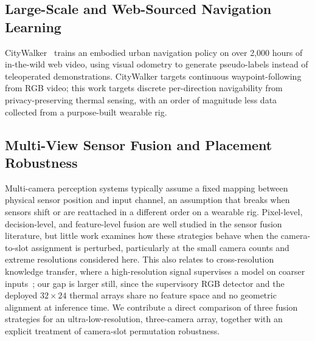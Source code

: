 \subsection{Large-Scale and Web-Sourced Navigation Learning}

CityWalker~\cite{liu2025citywalker} trains an embodied urban navigation policy on over 2{,}000 hours of in-the-wild web video, using visual odometry to generate pseudo-labels instead of teleoperated demonstrations. CityWalker targets continuous waypoint-following from RGB video; this work targets discrete per-direction navigability from privacy-preserving thermal sensing, with an order of magnitude less data collected from a purpose-built wearable rig.

\subsection{Multi-View Sensor Fusion and Placement Robustness}

Multi-camera perception systems typically assume a fixed mapping between physical sensor position and input channel, an assumption that breaks when sensors shift or are reattached in a different order on a wearable rig. Pixel-level, decision-level, and feature-level fusion are well studied in the sensor fusion literature, but little work examines how these strategies behave when the camera-to-slot assignment is perturbed, particularly at the small camera counts and extreme resolutions considered here. This also relates to cross-resolution knowledge transfer, where a high-resolution signal supervises a model on coarser inputs~\cite{qi2021msad}; our gap is larger still, since the supervisory RGB detector and the deployed $32\times24$ thermal arrays share no feature space and no geometric alignment at inference time. We contribute a direct comparison of three fusion strategies for an ultra-low-resolution, three-camera array, together with an explicit treatment of camera-slot permutation robustness.
